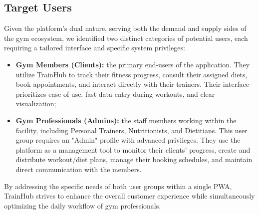 \subsection{Target Users}\label{subsect:TargetUsers}
Given the platform's dual nature, serving both the demand and supply sides of the gym ecosystem, we identified two distinct categories of potential users, each requiring a tailored interface and specific system privileges:

\begin{itemize}
    \item \textbf{Gym Members (Clients):} the primary end-users of the application. They utilize TrainHub to track their fitness progress, consult their assigned diets, book appointments, and interact directly with their trainers. Their interface prioritizes ease of use, fast data entry during workouts, and clear visualization;
    \item \textbf{Gym Professionals (Admins):} the staff members working within the facility, including Personal Trainers, Nutritionists, and Dietitians. This user group requires an "Admin" profile with advanced privileges. They use the platform as a management tool to monitor their clients' progress, create and distribute workout/diet plans, manage their booking schedules, and maintain direct communication with the members.
\end{itemize}

By addressing the specific needs of both user groups within a single PWA, TrainHub strives to enhance the overall customer experience while simultaneously optimizing the daily workflow of gym professionals.